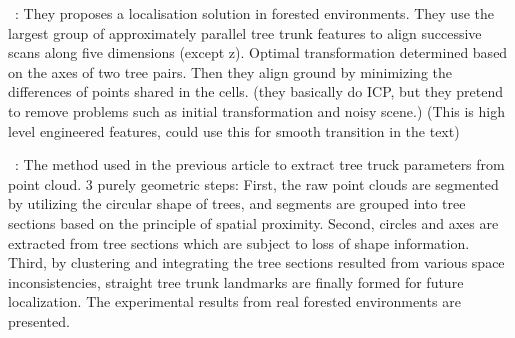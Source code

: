 ~\cite{Song2012}:
They proposes a localisation solution in forested environments. They use the largest group of approximately parallel tree trunk features to align successive scans along five dimensions (except z). Optimal transformation determined based on the axes of two tree pairs. Then they align ground by minimizing the differences of points shared in the cells. (they basically do ICP, but they pretend to remove problems such as initial transformation and noisy scene.) (This is high level engineered features, could use this for smooth transition in the text)

~\cite{Iagnemma2012}:
The method used in the previous article to extract tree truck parameters from point cloud. 3 purely geometric steps: First, the raw point clouds are segmented by utilizing the circular shape of trees, and segments are grouped into tree sections based on the principle of spatial proximity. Second, circles and axes are extracted from tree sections which are subject to loss of shape information. Third, by clustering and integrating the tree sections resulted from various space inconsistencies, straight tree trunk landmarks are finally formed for future localization. The experimental results from real forested environments are presented.

